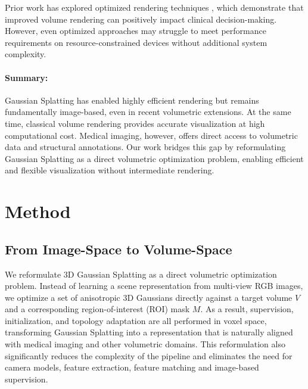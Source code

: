 \documentclass[runningheads]{llncs}
\begin{document}
Prior work has explored optimized rendering techniques \cite{avis2024}, which demonstrate that improved volume rendering can positively impact clinical decision-making. However, even optimized approaches may struggle to meet performance requirements on resource-constrained devices without additional system complexity.







\paragraph{Summary:}

Gaussian Splatting has enabled highly efficient rendering but remains fundamentally image-based, even in recent volumetric extensions. At the same time, classical volume rendering provides accurate visualization at high computational cost. Medical imaging, however, offers direct access to volumetric data and structural annotations. Our work bridges this gap by reformulating Gaussian Splatting as a direct volumetric optimization problem, enabling efficient and flexible visualization without intermediate rendering.




\section{Method}

\subsection{From Image-Space to Volume-Space}
We reformulate 3D Gaussian Splatting as a direct volumetric optimization problem. Instead of learning a scene representation from multi-view RGB images, we optimize a set of anisotropic 3D Gaussians directly against a target volume $V$ and a corresponding region-of-interest (ROI) mask $M$. As a result, supervision, initialization, and topology adaptation are all performed in voxel space, transforming Gaussian Splatting into a representation that is naturally aligned with medical imaging and other volumetric domains. This reformulation also significantly reduces the complexity of the pipeline and eliminates the need for camera models, feature extraction, feature matching and image-based supervision.
\end{document}
